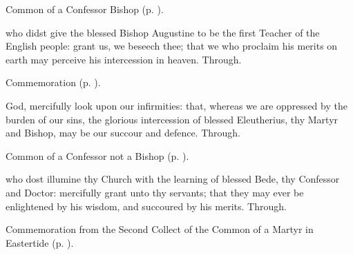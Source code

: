 
\begin{rubric}
	Common of a Confessor Bishop (p. \pageref{CommonConfessorBishop}).
\end{rubric}

{} who didst give the blessed Bishop Augustine to be the first Teacher of the English people: grant us, we beseech thee; that we who proclaim his merits on earth may perceive his intercession in heaven. Through.

\begin{rubric}
	Commemoration  (p. \pageref{EleutheriusCollect}).
\end{rubric}




\memorialCollect\label{EleutheriusCollect}
 God, mercifully look upon our infirmities: that, whereas we are oppressed by the burden of our sins, the glorious intercession of blessed Eleutherius, thy Martyr and Bishop, may be our succour and defence. Through.



\begin{rubric}
	Common of a Confessor not a Bishop (p. \pageref{CommonConfessorNotBishop}).
\end{rubric}

{} who dost illumine thy Church with the learning of blessed Bede, thy Confessor and Doctor: mercifully grant unto thy servants; that they may ever be enlightened by his wisdom, and succoured by his merits. Through.

\begin{rubric}
	Commemoration  from the Second Collect of the Common of a Martyr in Eastertide (p. \pageref{CommonMartyrBishopEasterCollect}).
\end{rubric}


